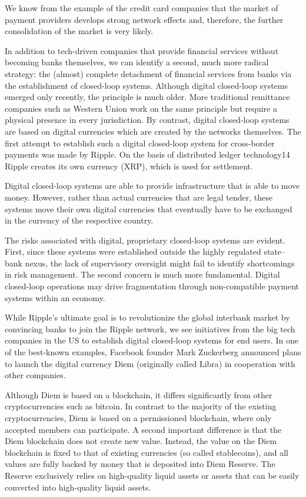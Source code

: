 \documentclass[
]{book}
\begin{document}
We know from the example of the credit card companies that the market of payment providers develops strong network effects and, therefore, the further consolidation of the market is very likely.

In addition to tech-driven companies that provide financial services without becoming banks themselves, we can identify a second, much more radical strategy: the (almost) complete detachment of financial services from banks via the establishment of closed-loop systems. Although digital closed-loop systems emerged only recently, the principle is much older. More traditional remittance companies such as Western Union work on the same principle but require a physical presence in every jurisdiction. By contrast, digital closed-loop systems are based on digital currencies which are created by the networks themselves. The first attempt to establish such a digital closed-loop system for cross-border payments was made by Ripple. On the basis of distributed ledger technology14 Ripple creates its own currency (XRP), which is used for settlement.

Digital closed-loop systems are able to provide infrastructure that is able to move money. However, rather than actual currencies that are legal tender, these systems move their own digital currencies that eventually have to be exchanged in the currency of the respective country.

The risks associated with digital, proprietary closed-loop systems are evident. First, since these systems were established outside the highly regulated state--bank nexus, the lack of supervisory oversight might fail to identify shortcomings in risk management. The second concern is much more fundamental. Digital closed-loop operations may drive fragmentation through non-compatible payment systems within an economy.

While Ripple's ultimate goal is to revolutionize the global interbank market by convincing banks to join the Ripple network, we see initiatives from the big tech companies in the US to establish digital closed-loop systems for end users. In one of the best-known examples, Facebook founder Mark Zuckerberg announced plans to launch the digital currency Diem (originally called Libra) in cooperation with other companies.

Although Diem is based on a blockchain, it differs significantly from other cryptocurrencies such as bitcoin. In contrast to the majority of the existing cryptocurrencies, Diem is based on a permissioned blockchain, where only accepted members can participate. A second important difference is that the Diem blockchain does not create new value. Instead, the value on the Diem blockchain is fixed to that of existing currencies (so called stablecoins), and all values are fully backed by money that is deposited into Diem Reserve.
The Reserve exclusively relies on high-quality liquid assets or assets that can be easily converted into high-quality liquid assets.
\end{document}
